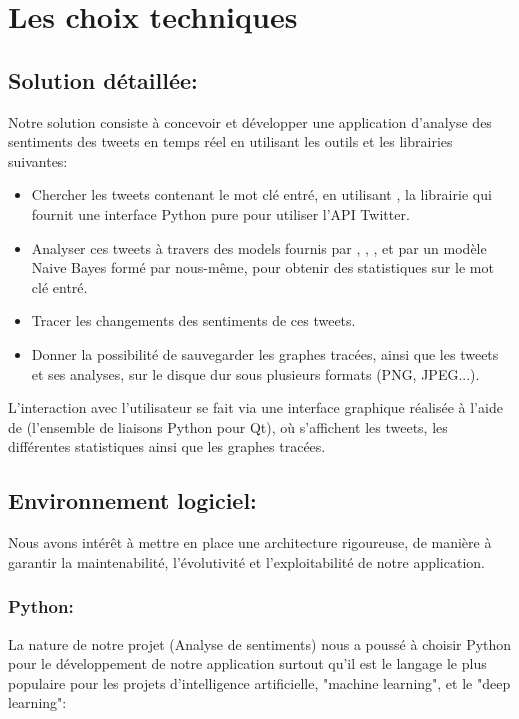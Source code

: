 \chapter{Les choix techniques}

\section{Solution détaillée:}
Notre solution consiste à concevoir et développer une application d'analyse des sentiments des tweets en temps réel en utilisant les outils et les librairies suivantes:
\begin{itemize}
    \item Chercher les tweets contenant le mot clé entré, en utilisant , la librairie qui fournit une interface Python pure pour utiliser l'API Twitter.
    \item Analyser ces tweets à travers des models fournis par , , , et par un modèle Naive Bayes formé par nous-même, pour obtenir des statistiques sur le mot clé entré.
    \item Tracer les changements des sentiments de ces tweets.
    \item Donner la possibilité de sauvegarder les graphes tracées, ainsi que les tweets et ses analyses, sur le disque dur sous plusieurs formats (PNG, JPEG...).
\end{itemize}

L'interaction avec l'utilisateur se fait via une interface graphique réalisée à l'aide de  (l'ensemble de liaisons Python pour Qt), où s'affichent les tweets, les différentes statistiques ainsi que les graphes tracées.

\section{Environnement logiciel:}
Nous avons intérêt à mettre en place une architecture rigoureuse, de manière à garantir la
maintenabilité, l'évolutivité et l'exploitabilité de notre application.

\subsection{Python:}
La nature de notre projet (Analyse de sentiments) nous a poussé à choisir Python pour le développement de notre application surtout qu'il est le langage le plus populaire pour les projets d'intelligence artificielle, "machine learning", et le "deep learning": \cite{python}

